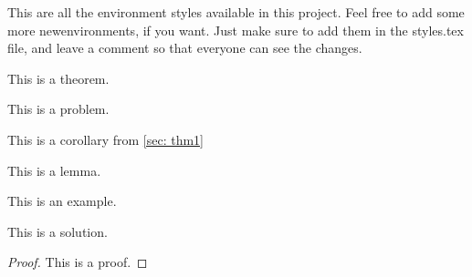 This are all the environment styles available in this project. Feel free to add some more newenvironments, if you want. Just make sure to add them in the styles.tex file, and leave a comment so that everyone can see the changes.

\begin{thm}
\label{sec: thm1}
This is a theorem.
\end{thm}

\begin{problem}
This is a problem.
\end{problem}

\begin{corr}
This is a corollary from \ref{sec: thm1}
\end{corr}

\begin{lem}
This is a lemma.
\end{lem}

\begin{example}
This is an example.
\end{example}

\begin{soln}
This is a solution.
\end{soln}

\begin{proof}
This is a proof.
\end{proof}